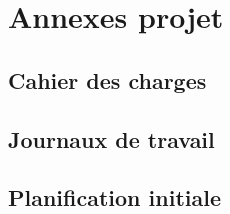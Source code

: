 \documentclass[french]{article}
\begin{document}
	\newpage
		
		
	\section{Annexes projet}
		\subsection{Cahier des charges}
			
		\subsection{Journaux de travail}
		
		\subsection{Planification initiale}
				
\end{document}
